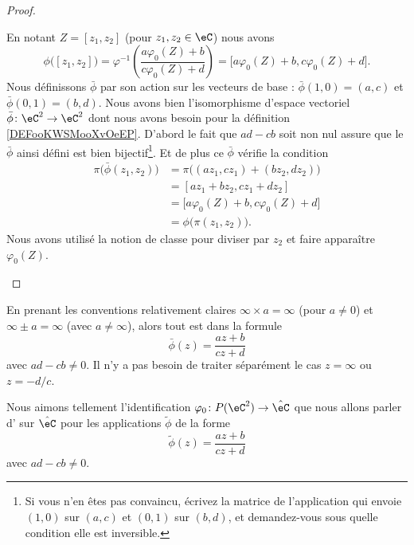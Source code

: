 \begin{proof}
\begin{subproof}
    En notant \( Z=[z_1,z_2]\) (pour \( z_1,z_2\in \eC\)) nous avons
    \begin{equation}
        \phi\big( [z_1,z_2] \big)=\varphi^{-1}\left( \frac{ a\varphi_0(Z)+b }{ c\varphi_0(Z)+d } \right)=\big[ a\varphi_0(Z)+b,c\varphi_0(Z)+d \big].
    \end{equation}
    Nous définissons \( \bar\phi\) par son action sur les vecteurs de base : \( \bar\phi(1,0)=(a,c)\) et \( \bar\phi(0,1)=(b,d)\). Nous avons bien l'isomorphisme d'espace vectoriel \( \bar\phi\colon \eC^2\to \eC^2\) dont nous avons besoin pour la définition \ref{DEFooKWSMooXvOeEP}. D'abord le fait que \( ad-cb\) soit non nul assure que le \( \bar\phi\) ainsi défini  est bien bijectif\footnote{Si vous n'en êtes pas convaincu, écrivez la matrice de l'application qui envoie \( (1,0)\) sur \( (a,c)\) et \( (0,1)\) sur \( (b,d)\), et demandez-vous sous quelle condition elle est inversible.}. Et de plus ce \( \bar\phi\) vérifie la condition
    \begin{subequations}
        \begin{align}
            \pi\big( \bar\phi(z_1,z_2) \big)&=\pi\big( (az_1,cz_1)+(bz_2,dz_2) \big)\\
            &=[az_1+bz_2,cz_1+dz_2]\\
            &=\big[ a\varphi_0(Z)+b,c\varphi_0(Z)+d \big]\\
            &=\phi\big( \pi(z_1,z_2) \big).
        \end{align}
    \end{subequations}
    Nous avons utilisé la notion de classe pour diviser par \( z_2\) et faire apparaître \( \varphi_0(Z)\).
    \end{subproof}
\end{proof}

\begin{remark}
    En prenant les conventions relativement claires \( \infty\times a=\infty\) (pour \( a\neq 0\)) et \( \infty\pm a=\infty\) (avec \( a\neq \infty\)), alors tout est dans la formule
    \begin{equation}
        \bar\phi(z)=\frac{ az+b }{ cz+d }
    \end{equation}
    avec \( ad-cb\neq 0\). Il n'y a pas besoin de traiter séparément le cas \( z=\infty\) ou \( z=-d/c\).
\end{remark}


\begin{definition}      \label{DEFooAMQHooPFUgIa}
    Nous aimons tellement l'identification \( \varphi_0\colon P(\eC^2)\to \hat \eC\) que nous allons parler d' sur \( \hat \eC\) pour les applications \( \tilde \phi\) de la forme
    \begin{equation}
        \tilde \phi(z)=\frac{ az+b }{ cz+d }
    \end{equation}
    avec \( ad-cb\neq 0\).
\end{definition}

